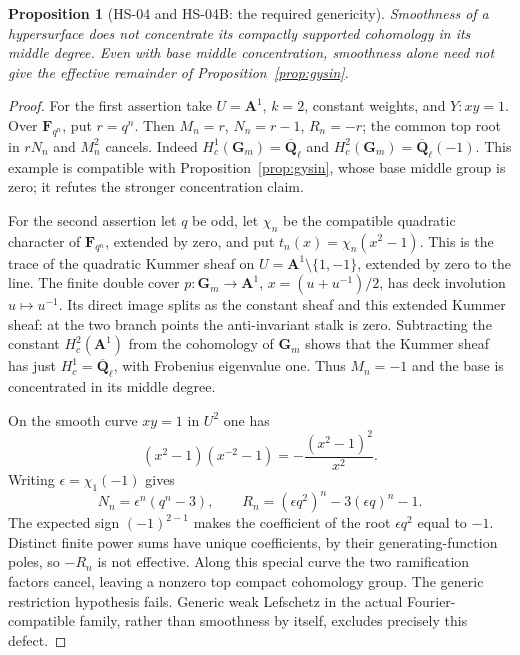 \documentclass[11pt,a4paper]{article}
\newtheorem{proposition}[theorem]{Proposition}
\theoremstyle{remark}
\begin{document}
\begin{proposition}[HS-04 and HS-04B: the required genericity]
Smoothness of a hypersurface does not concentrate its compactly supported
cohomology in its middle degree.  Even with base middle concentration,
smoothness alone need not give the effective remainder of
Proposition~\ref{prop:gysin}.
\end{proposition}
\begin{proof}
For the first assertion take $U=\mathbf A^1$, $k=2$, constant weights,
and $Y:xy=1$.  Over $\mathbf F_{q^n}$, put $r=q^n$.
Then $M_n=r$, $N_n=r-1$, $R_n=-r$; the common top root in
$rN_n$ and $M_n^2$ cancels.  Indeed
$H_c^1(\mathbf G_m)=\overline{\mathbf Q}_\ell$ and
$H_c^2(\mathbf G_m)=\overline{\mathbf Q}_\ell(-1)$.
This example is compatible with Proposition~\ref{prop:gysin}, whose
base middle group is zero; it refutes the stronger concentration claim.

For the second assertion let $q$ be odd, let $\chi_n$ be the compatible
quadratic character of $\mathbf F_{q^n}$, extended by zero, and put
$t_n(x)=\chi_n(x^2-1)$.  This is the trace of the quadratic Kummer sheaf
on $U=\mathbf A^1\setminus\{1,-1\}$, extended by zero to the line.
The finite double cover $p:\mathbf G_m\to\mathbf A^1$,
$x=(u+u^{-1})/2$, has deck involution $u\mapsto u^{-1}$.
Its direct image splits as the constant sheaf and this extended Kummer
sheaf: at the two branch points the anti-invariant stalk is zero.
Subtracting the constant $H_c^2(\mathbf A^1)$ from the cohomology of
$\mathbf G_m$ shows that the Kummer sheaf has just
$H_c^1=\overline{\mathbf Q}_\ell$, with Frobenius eigenvalue one.
Thus $M_n=-1$ and the base is concentrated in its middle degree.

On the smooth curve $xy=1$ in $U^2$ one has
\[
 (x^2-1)(x^{-2}-1)=-\frac{(x^2-1)^2}{x^2}.
\]
Writing $\epsilon=\chi_1(-1)$ gives
\[
 N_n=\epsilon^n(q^n-3),\qquad
 R_n=(\epsilon q^2)^n-3(\epsilon q)^n-1.
\]
The expected sign $(-1)^{2-1}$ makes the coefficient of the root
$\epsilon q^2$ equal to $-1$.  Distinct finite power sums have unique
coefficients, by their generating-function poles, so $-R_n$ is not
effective.  Along this special curve the two ramification factors
cancel, leaving a nonzero top compact cohomology group.  The generic
restriction hypothesis fails.  Generic weak Lefschetz in the actual
Fourier-compatible family, rather than smoothness by itself, excludes
precisely this defect.
\end{proof}
\end{document}
